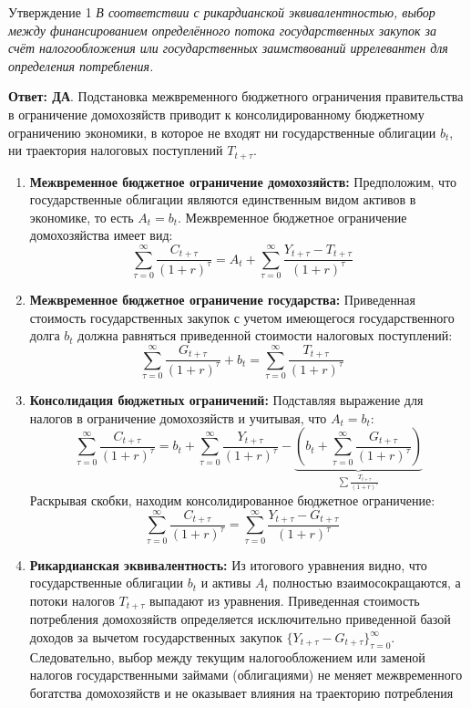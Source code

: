 \documentclass[10pt,a4paper]{article}
\newcommand{\qda}{\textbf{\color{yesgreen}Ответ: ДА}}
\newenvironment{answer}[2]{%
  \begin{qbox}{Утверждение #1}
  \textit{#2}\par\smallskip
}{%
  \end{qbox}\vspace{2pt}
}
\begin{document}
\begin{answer}{1}{В соответствии с рикардианской эквивалентностью, выбор между финансированием определённого потока государственных закупок за счёт налогообложения или государственных заимствований иррелевантен для определения потребления.}
\qda. Подстановка межвременного бюджетного ограничения правительства в ограничение домохозяйств приводит к консолидированному бюджетному ограничению экономики, в которое не входят ни государственные облигации $b_t$, ни траектория налоговых поступлений $T_{t+\tau}$.

\begin{enumerate}
    \item \textbf{Межвременное бюджетное ограничение домохозяйств:}
    Предположим, что государственные облигации являются единственным видом активов в экономике, то есть $A_t = b_t$. Межвременное бюджетное ограничение домохозяйства имеет вид:
    \[
    \sum_{\tau=0}^{\infty} \frac{C_{t+\tau}}{(1+r)^\tau} = A_t + \sum_{\tau=0}^{\infty} \frac{Y_{t+\tau} - T_{t+\tau}}{(1+r)^\tau} \quad 
    \]

    \item \textbf{Межвременное бюджетное ограничение государства:}
    Приведенная стоимость государственных закупок с учетом имеющегося государственного долга $b_t$ должна равняться приведенной стоимости налоговых поступлений:
    \[
    \sum_{\tau=0}^{\infty} \frac{G_{t+\tau}}{(1+r)^\tau} + b_t = \sum_{\tau=0}^{\infty} \frac{T_{t+\tau}}{(1+r)^\tau} \quad
    \]

    \item \textbf{Консолидация бюджетных ограничений:}
    Подставляя выражение для налогов в ограничение домохозяйств и учитывая, что $A_t = b_t$:
    \[
    \sum_{\tau=0}^{\infty} \frac{C_{t+\tau}}{(1+r)^\tau} = b_t + \sum_{\tau=0}^{\infty} \frac{Y_{t+\tau}}{(1+r)^\tau} - \underbrace{\left( b_t + \sum_{\tau=0}^{\infty} \frac{G_{t+\tau}}{(1+r)^\tau} \right)}_{\sum \frac{T_{t+\tau}}{(1+r)^\tau}}
    \]
    Раскрывая скобки, находим консолидированное бюджетное ограничение:
    \[
    \sum_{\tau=0}^{\infty} \frac{C_{t+\tau}}{(1+r)^\tau} = \sum_{\tau=0}^{\infty} \frac{Y_{t+\tau} - G_{t+\tau}}{(1+r)^\tau} \quad
    \]

    \item \textbf{Рикардианская эквивалентность:}
    Из итогового уравнения видно, что государственные облигации $b_t$ и активы $A_t$ полностью взаимосокращаются, а потоки налогов $T_{t+\tau}$ выпадают из уравнения. Приведенная стоимость потребления домохозяйств определяется исключительно приведенной базой доходов за вычетом государственных закупок $\{Y_{t+\tau} - G_{t+\tau}\}_{\tau=0}^{\infty}$. Следовательно, выбор между текущим налогообложением или заменой налогов государственными займами (облигациями) не меняет межвременного богатства домохозяйств и не оказывает влияния на траекторию потребления
\end{enumerate}
\end{answer}
\end{document}
